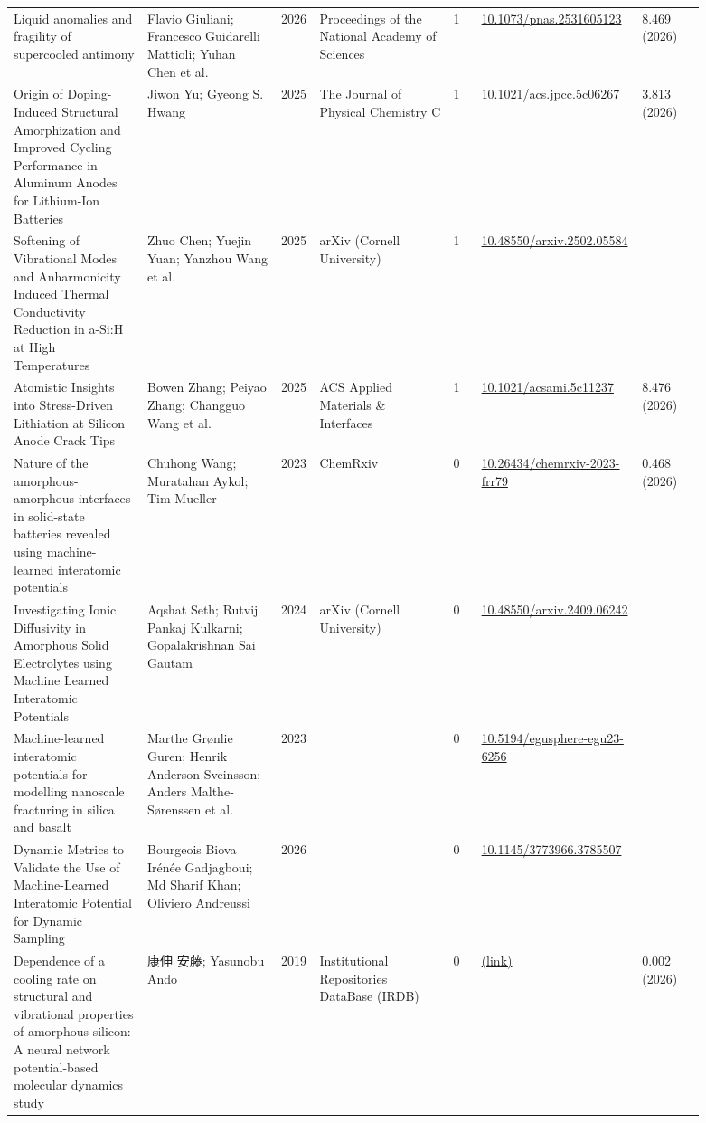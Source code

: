 \documentclass[10pt,a4paper]{article}
\begin{document}
{\begin{longtable}{p{0.192\linewidth}p{0.192\linewidth}p{0.043\linewidth}p{0.192\linewidth}p{0.043\linewidth}p{0.132\linewidth}p{0.096\linewidth}}
Liquid anomalies and fragility of supercooled antimony & Flavio Giuliani; Francesco Guidarelli Mattioli; Yuhan Chen et al. & 2026 & Proceedings of the National Academy of Sciences & 1 & \href{https://doi.org/10.1073/pnas.2531605123}{10.1073/pnas.2531605123} & 8.469 (2026) \\
Origin of Doping-Induced Structural Amorphization and Improved Cycling Performance in Aluminum Anodes for Lithium-Ion Batteries & Jiwon Yu; Gyeong S. Hwang & 2025 & The Journal of Physical Chemistry C & 1 & \href{https://doi.org/10.1021/acs.jpcc.5c06267}{10.1021/acs.jpcc.5c06267} & 3.813 (2026) \\
Softening of Vibrational Modes and Anharmonicity Induced Thermal Conductivity Reduction in a-Si:H at High Temperatures & Zhuo Chen; Yuejin Yuan; Yanzhou Wang et al. & 2025 & arXiv (Cornell University) & 1 & \href{https://doi.org/10.48550/arxiv.2502.05584}{10.48550/arxiv.2502.05584} &  \\
Atomistic Insights into Stress-Driven Lithiation at Silicon Anode Crack Tips & Bowen Zhang; Peiyao Zhang; Changguo Wang et al. & 2025 & ACS Applied Materials \& Interfaces & 1 & \href{https://doi.org/10.1021/acsami.5c11237}{10.1021/acsami.5c11237} & 8.476 (2026) \\
Nature of the amorphous-amorphous interfaces in solid-state batteries revealed using machine-learned interatomic potentials & Chuhong Wang; Muratahan Aykol; Tim Mueller & 2023 & ChemRxiv & 0 & \href{https://doi.org/10.26434/chemrxiv-2023-frr79}{10.26434/chemrxiv-2023-frr79} & 0.468 (2026) \\
Investigating Ionic Diffusivity in Amorphous Solid Electrolytes using Machine Learned Interatomic Potentials & Aqshat Seth; Rutvij Pankaj Kulkarni; Gopalakrishnan Sai Gautam & 2024 & arXiv (Cornell University) & 0 & \href{https://doi.org/10.48550/arxiv.2409.06242}{10.48550/arxiv.2409.06242} &  \\
Machine-learned interatomic potentials for modelling nanoscale fracturing in silica and basalt & Marthe Grønlie Guren; Henrik Anderson Sveinsson; Anders Malthe‐Sørenssen et al. & 2023 &  & 0 & \href{https://doi.org/10.5194/egusphere-egu23-6256}{10.5194/egusphere-egu23-6256} &  \\
Dynamic Metrics to Validate the Use of Machine-Learned Interatomic Potential for Dynamic Sampling & Bourgeois Biova Irénée Gadjagboui; Md Sharif Khan; Oliviero Andreussi & 2026 &  & 0 & \href{https://doi.org/10.1145/3773966.3785507}{10.1145/3773966.3785507} &  \\
Dependence of a cooling rate on structural and vibrational properties of amorphous silicon: A neural network potential-based molecular dynamics study & 康伸 安藤; Yasunobu Ando & 2019 & Institutional Repositories DataBase (IRDB) & 0 & \href{https://openalex.org/W7145405791}{(link)} & 0.002 (2026) \\

\end{longtable}}
\end{document}
